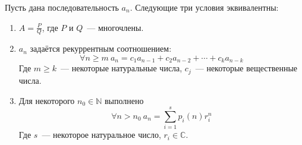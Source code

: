 \documentclass{article}
\begin{document}
    \begin{theorem}
        Пусть дана последовательность $a_n$. Следующие три условия эквивалентны:
        \begin{enumerate}
            \item $A=\frac PQ$, где $P$ и $Q$~--- многочлены.
            \item $a_n$ задаётся рекуррентным соотношением:
            $$
            \forall n\geqslant m~a_n=c_1a_{n-1}+c_2a_{n-2}+\cdots+c_ka_{n-k}
            $$
            Где $m\geqslant k$~--- некоторые натуральные числа, $c_j$~--- некоторые вещественные числа.
            \item Для некоторого $n_0\in\mathbb N$ выполнено
            $$
            \forall n>n_0~a_n=\sum\limits_{i=1}^sp_i(n)r_i^n
            $$
            Где $s$~--- некоторое натуральное число, $r_i\in\mathbb C$.
        \end{enumerate}
    \end{theorem}
\end{document}
